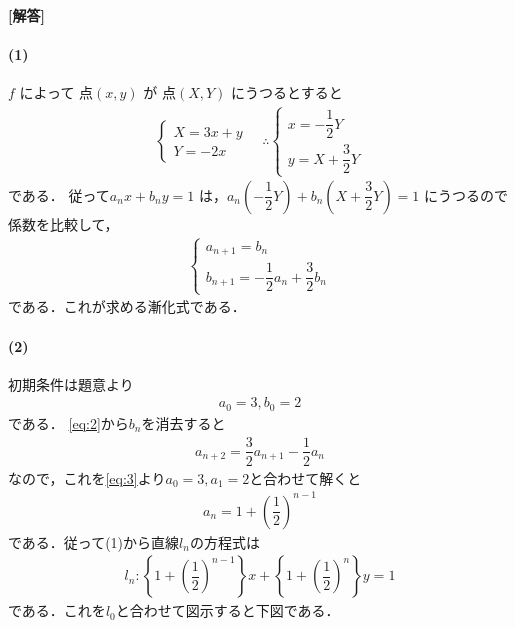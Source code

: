 \documentclass[../../main.tex]{subfiles}
\begin{document}
\begin{oframed}
  
\end{oframed}

{\bf [解答]}

\paragraph{(1)}

$f$ によって 点$(x, y)$ が 点$(X, Y)$ にうつるとすると
\begin{align}
  \begin{cases}
    X = 3x + y \\
    Y = -2x
  \end{cases}
  \quad \therefore
  \begin{cases}
    x = -\dfrac{1}{2}Y \\
    y = X + \dfrac{3}{2}Y
  \end{cases} \label{eq:1}
\end{align}
である．
従って$a_n x + b_n y = 1$ は，$a_n \left(-\dfrac{1}{2}Y\right) + b_n \left(X + \dfrac{3}{2}Y\right) = 1$ にうつるので係数を比較して，
\begin{align}
  \begin{cases}
    a_{n+1} = b_n \\
    b_{n+1} = -\dfrac{1}{2}a_n + \dfrac{3}{2}b_n
  \end{cases} \label{eq:2}
\end{align}
である．これが求める漸化式である．

\paragraph{(2)}

初期条件は題意より
\begin{align}
  a_0 = 3, b_0 = 2 \label{eq:3}
\end{align}
である．
\cref{eq:2}から$b_n$を消去すると
\begin{align}
  a_{n+2} = \dfrac{3}{2}a_{n+1} - \dfrac{1}{2}a_n
\end{align}
なので，これを\cref{eq:3}より$a_0=3, a_1=2$と合わせて解くと
\begin{align}
  a_n = 1 + \left(\dfrac{1}{2}\right)^{n-1} \label{eq:4}
\end{align}
である．従って(1)から直線$l_n$の方程式は
\begin{align}
  l_n : \left\{1+\left(\dfrac{1}{2}\right)^{n-1}\right\}x + \left\{1+\left(\dfrac{1}{2}\right)^n\right\}y = 1 \label{eq:5}
\end{align}
である．これを$l_0$と合わせて図示すると下図である．
\end{document}
